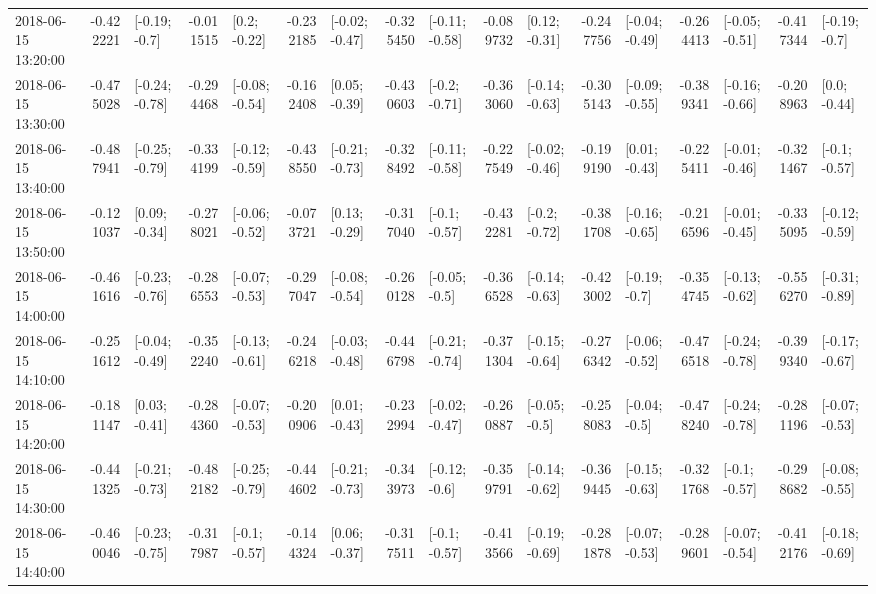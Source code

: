 \begin{tabular}{lrlrlrlrlrlrlrlrl}
2018-06-15 13:20:00 & -0.422221 &   [-0.19; -0.7] & -0.011515 &    [0.2; -0.22] & -0.232185 &  [-0.02; -0.47] & -0.325450 &  [-0.11; -0.58] & -0.089732 &   [0.12; -0.31] & -0.247756 &  [-0.04; -0.49] & -0.264413 &  [-0.05; -0.51] & -0.417344 &   [-0.19; -0.7] \\
2018-06-15 13:30:00 & -0.475028 &  [-0.24; -0.78] & -0.294468 &  [-0.08; -0.54] & -0.162408 &   [0.05; -0.39] & -0.430603 &   [-0.2; -0.71] & -0.363060 &  [-0.14; -0.63] & -0.305143 &  [-0.09; -0.55] & -0.389341 &  [-0.16; -0.66] & -0.208963 &    [0.0; -0.44] \\
2018-06-15 13:40:00 & -0.487941 &  [-0.25; -0.79] & -0.334199 &  [-0.12; -0.59] & -0.438550 &  [-0.21; -0.73] & -0.328492 &  [-0.11; -0.58] & -0.227549 &  [-0.02; -0.46] & -0.199190 &   [0.01; -0.43] & -0.225411 &  [-0.01; -0.46] & -0.321467 &   [-0.1; -0.57] \\
2018-06-15 13:50:00 & -0.121037 &   [0.09; -0.34] & -0.278021 &  [-0.06; -0.52] & -0.073721 &   [0.13; -0.29] & -0.317040 &   [-0.1; -0.57] & -0.432281 &   [-0.2; -0.72] & -0.381708 &  [-0.16; -0.65] & -0.216596 &  [-0.01; -0.45] & -0.335095 &  [-0.12; -0.59] \\
2018-06-15 14:00:00 & -0.461616 &  [-0.23; -0.76] & -0.286553 &  [-0.07; -0.53] & -0.297047 &  [-0.08; -0.54] & -0.260128 &   [-0.05; -0.5] & -0.366528 &  [-0.14; -0.63] & -0.423002 &   [-0.19; -0.7] & -0.354745 &  [-0.13; -0.62] & -0.556270 &  [-0.31; -0.89] \\
2018-06-15 14:10:00 & -0.251612 &  [-0.04; -0.49] & -0.352240 &  [-0.13; -0.61] & -0.246218 &  [-0.03; -0.48] & -0.446798 &  [-0.21; -0.74] & -0.371304 &  [-0.15; -0.64] & -0.276342 &  [-0.06; -0.52] & -0.476518 &  [-0.24; -0.78] & -0.399340 &  [-0.17; -0.67] \\
2018-06-15 14:20:00 & -0.181147 &   [0.03; -0.41] & -0.284360 &  [-0.07; -0.53] & -0.200906 &   [0.01; -0.43] & -0.232994 &  [-0.02; -0.47] & -0.260887 &   [-0.05; -0.5] & -0.258083 &   [-0.04; -0.5] & -0.478240 &  [-0.24; -0.78] & -0.281196 &  [-0.07; -0.53] \\
2018-06-15 14:30:00 & -0.441325 &  [-0.21; -0.73] & -0.482182 &  [-0.25; -0.79] & -0.444602 &  [-0.21; -0.73] & -0.343973 &   [-0.12; -0.6] & -0.359791 &  [-0.14; -0.62] & -0.369445 &  [-0.15; -0.63] & -0.321768 &   [-0.1; -0.57] & -0.298682 &  [-0.08; -0.55] \\
2018-06-15 14:40:00 & -0.460046 &  [-0.23; -0.75] & -0.317987 &   [-0.1; -0.57] & -0.144324 &   [0.06; -0.37] & -0.317511 &   [-0.1; -0.57] & -0.413566 &  [-0.19; -0.69] & -0.281878 &  [-0.07; -0.53] & -0.289601 &  [-0.07; -0.54] & -0.412176 &  [-0.18; -0.69] \\

\end{tabular}
